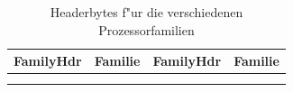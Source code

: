 \documentclass[12pt,a4paper,twoside]{report}
\begin{document}
\setcounter{headidcounter}{1}
\newcommand{\headid}[2]{#1 & #2
  \ifnum\value{headidcounter}>1 \\ \fi
  \ifnum\value{headidcounter}<2 & \fi
  \stepcounter{headidcounter}
  \ifnum\value{headidcounter}>2
   \setcounter{headidcounter}{1}
  \fi
}

\begin{center}\begin{longtable}{|c|l||c|l|}
\hline
FamilyHdr & Familie & FamilyHdr & Familie \\
\hline
\hline
\endhead

\\ \hline
\caption{Headerbytes f"ur die verschiedenen Prozessorfamilien}
\label{TabHeader}
\end{longtable}\end{center}
\end{document}
